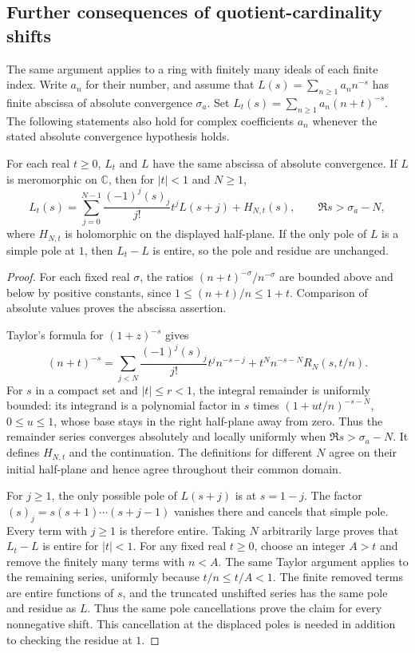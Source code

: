 \subsection{Further consequences of quotient-cardinality shifts}

The same argument applies to a ring with finitely many ideals of each
finite index. Write $a_n$ for their number, and assume that
$L(s)=\sum_{n\ge1}a_n n^{-s}$ has finite abscissa of absolute convergence
$\sigma_a$. Set $L_t(s)=\sum_{n\ge1}a_n(n+t)^{-s}$. The following statements
also hold for complex coefficients $a_n$ whenever the stated absolute
convergence hypothesis holds.

\begin{proposition}\label{prop:quotient-shift-remainder}
For each real $t\ge0$, $L_t$ and $L$ have the same abscissa of absolute
convergence. If $L$ is meromorphic on $\mathbb C$, then for $|t|<1$ and
$N\ge1$,
\[
 L_t(s)=\sum_{j=0}^{N-1}\frac{(-1)^j(s)_j}{j!}t^j L(s+j)+H_{N,t}(s),
 \qquad \Re s>\sigma_a-N,
\]
where $H_{N,t}$ is holomorphic on the displayed half-plane. If the only
pole of $L$ is a simple pole at $1$, then $L_t-L$ is entire, so the pole
and residue are unchanged.
\end{proposition}
\begin{proof}
For each fixed real $\sigma$, the ratios
$(n+t)^{-\sigma}/n^{-\sigma}$ are bounded above and below by positive
constants, since $1\le(n+t)/n\le1+t$. Comparison of absolute values proves
the abscissa assertion.

Taylor's formula for $(1+z)^{-s}$ gives
\[
 (n+t)^{-s}=\sum_{j<N}\frac{(-1)^j(s)_j}{j!}t^j n^{-s-j}
       +t^N n^{-s-N}R_N(s,t/n).
\]
For $s$ in a compact set and $|t|\le r<1$, the integral remainder is
uniformly bounded: its integrand is a polynomial factor in $s$ times
$(1+u t/n)^{-s-N}$, $0\le u\le1$, whose base stays in the right half-plane
away from zero. Thus the remainder series converges absolutely and
locally uniformly when $\Re s>\sigma_a-N$. It defines $H_{N,t}$ and the
continuation. The definitions for different $N$ agree on their initial
half-plane and hence agree throughout their common domain.

For $j\ge1$, the only possible pole of $L(s+j)$ is at $s=1-j$. The factor
$(s)_j=s(s+1)\cdots(s+j-1)$ vanishes there and cancels that simple pole.
Every term with $j\ge1$ is therefore entire. Taking $N$ arbitrarily large
proves that $L_t-L$ is entire for $|t|<1$. For any fixed real $t\ge0$,
choose an integer $A>t$ and remove the finitely many terms with $n<A$.
The same Taylor argument applies to the remaining series, uniformly
because $t/n\le t/A<1$. The finite removed terms are entire functions
of $s$, and the truncated unshifted series has the same pole and
residue as $L$. Thus the same pole cancellations prove the claim for
every nonnegative shift. This cancellation at the displaced poles
is needed in addition to checking the residue at $1$.
\end{proof}

